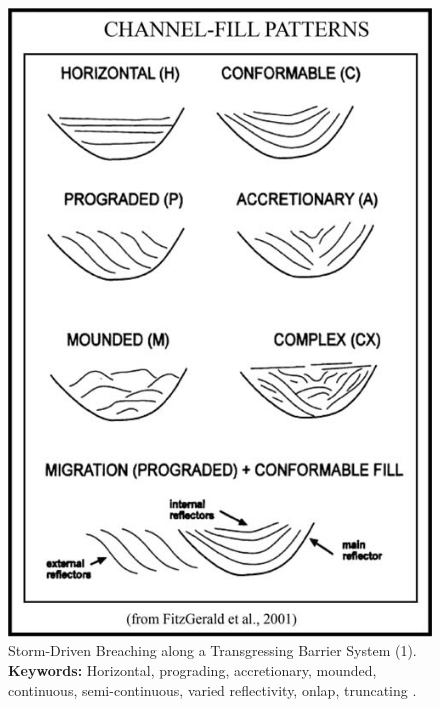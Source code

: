 \begin{figure}[h!]
    \centering
    \includegraphics[width=0.9\linewidth]{Figures/0.2GPR/Maio2015_channelfill.png}
    \caption[Storm-Driven Breaching along a Transgressing Barrier System (1).]{Storm-Driven Breaching along a Transgressing Barrier System (1). \textbf{Keywords: } Horizontal, prograding, accretionary, mounded, continuous, semi-continuous, varied reflectivity, onlap, truncating   \citep{Maio2016}.}
    \label{fig:Maio2016-1}
\end{figure}

